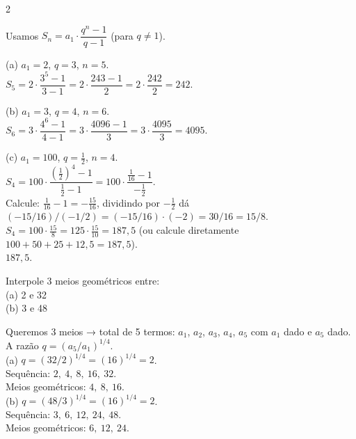 \documentclass[11pt]{article}
\begin{document}
\begin{multicols}{2}
\begin{enumerate}[leftmargin=*]
\begin{tcolorbox}[colback=green!10,colframe=green!60!black,title=\textbf{Solução da questão 5 },text width=0.9\columnwidth]
Usamos $S_n = a_1\cdot\dfrac{q^{n}-1}{q-1}$ (para $q\neq1$).

(a) $a_1=2$, $q=3$, $n=5$. \\
$S_5 = 2\cdot\dfrac{3^{5}-1}{3-1} = 2\cdot\dfrac{243-1}{2} = 2\cdot\dfrac{242}{2} = \boxed{242}.$

(b) $a_1=3$, $q=4$, $n=6$. \\
$S_6 = 3\cdot\dfrac{4^{6}-1}{4-1} = 3\cdot\dfrac{4096-1}{3} = 3\cdot\dfrac{4095}{3} = \boxed{4095}.$

(c) $a_1=100$, $q=\tfrac{1}{2}$, $n=4$. \\
$S_4 = 100\cdot\dfrac{(\tfrac12)^4 - 1}{\tfrac12 - 1} = 100\cdot\dfrac{\tfrac{1}{16}-1}{- \tfrac12}$. \\
Calcule: $\tfrac{1}{16}-1 = -\tfrac{15}{16}$, dividindo por $-\tfrac12$ dá $(-15/16)/(-1/2)=(-15/16)\cdot(-2)=30/16=15/8$. \\
$S_4 = 100\cdot \tfrac{15}{8} = 125\cdot \tfrac{15}{10} = 187{,}5$ (ou calcule diretamente $100+50+25+12{,}5=187{,}5$). \\
\(\boxed{187{,}5}\).
\end{tcolorbox}

\begin{tcolorbox}[colback=blue!8,colframe=blue!60!black,title=\textbf{Questão 6 },text width=0.85\columnwidth]
Interpole 3 meios geométricos entre: \\
(a) 2 e 32 \\ (b) 3 e 48
\end{tcolorbox}

\begin{tcolorbox}[colback=green!10,colframe=green!60!black,title=\textbf{Solução da questão 6 },text width=0.85\columnwidth]
Queremos 3 meios → total de 5 termos: $a_1$, $a_2$, $a_3$, $a_4$, $a_5$ com $a_1$ dado e $a_5$ dado. A razão $q=(a_5/a_1)^{1/4}$. \\

(a) $q=(32/2)^{1/4}=(16)^{1/4}=2$. \\
Sequência: $2,\ 4,\ 8,\ 16,\ 32$. \\
Meios geométricos: \(\boxed{4,\ 8,\ 16}\). \\

(b) $q=(48/3)^{1/4}=(16)^{1/4}=2$. \\
Sequência: $3,\ 6,\ 12,\ 24,\ 48$. \\
Meios geométricos: \(\boxed{6,\ 12,\ 24}\).
\end{tcolorbox}


\end{enumerate}
\end{multicols}
\end{document}
